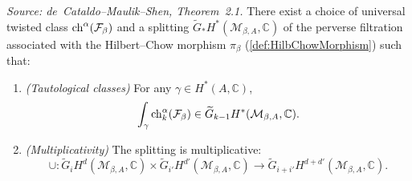 
\begin{theorem}
  \label{thm:taut_abelian_splitting}
  \textit{Source: de~Cataldo--Maulik--Shen, Theorem~2.1.}
  There exist a choice of universal twisted class
  \(\operatorname{ch}^\alpha(\mathcal{F}_\beta)\) and a splitting
  \(\widetilde{G}_* H^*(\mathcal{M}_{\beta,A}, \mathbb{C})\) of the perverse
  filtration associated with the Hilbert--Chow morphism
  \(\pi_\beta\) (\cref{def:HilbChowMorphism}) such that:
  \begin{enumerate}
    \item[(a)] \emph{(Tautological classes)} For any
      \(\gamma \in H^*(A,\mathbb{C})\),
      \[
        \int_\gamma \operatorname{ch}_k^\alpha(\mathcal{F}_\beta)
          \in \widetilde{G}_{k-1} H^*(\mathcal{M}_{\beta,A}, \mathbb{C}).
      \]
    \item[(b)] \emph{(Multiplicativity)} The splitting is multiplicative:
      \[
        \cup \colon \widetilde{G}_i H^d(\mathcal{M}_{\beta,A}, \mathbb{C})
          \times \widetilde{G}_{i'} H^{d'}(\mathcal{M}_{\beta,A}, \mathbb{C})
          \longrightarrow
          \widetilde{G}_{i+i'} H^{d+d'}(\mathcal{M}_{\beta,A}, \mathbb{C}).
      \]
  \end{enumerate}
\end{theorem}

